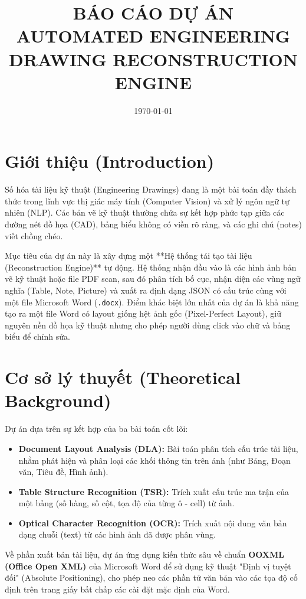\documentclass[12pt,a4paper]{article}
\title{\textbf{BÁO CÁO DỰ ÁN}\\ \Large{\textbf{AUTOMATED ENGINEERING DRAWING RECONSTRUCTION ENGINE}}}
\author{}
\date{\today}
\begin{document}
\maketitle
\tableofcontents
\newpage

\section{Giới thiệu (Introduction)}
Số hóa tài liệu kỹ thuật (Engineering Drawings) đang là một bài toán đầy thách thức trong lĩnh vực thị giác máy tính (Computer Vision) và xử lý ngôn ngữ tự nhiên (NLP). Các bản vẽ kỹ thuật thường chứa sự kết hợp phức tạp giữa các đường nét đồ họa (CAD), bảng biểu không có viền rõ ràng, và các ghi chú (notes) viết chồng chéo. 

Mục tiêu của dự án này là xây dựng một **Hệ thống tái tạo tài liệu (Reconstruction Engine)** tự động. Hệ thống nhận đầu vào là các hình ảnh bản vẽ kỹ thuật hoặc file PDF scan, sau đó phân tích bố cục, nhận diện các vùng ngữ nghĩa (Table, Note, Picture) và xuất ra định dạng JSON có cấu trúc cùng với một file Microsoft Word (\texttt{.docx}). Điểm khác biệt lớn nhất của dự án là khả năng tạo ra một file Word có layout giống hệt ảnh gốc (Pixel-Perfect Layout), giữ nguyên nền đồ họa kỹ thuật nhưng cho phép người dùng click vào chữ và bảng biểu để chỉnh sửa.

\section{Cơ sở lý thuyết (Theoretical Background)}
Dự án dựa trên sự kết hợp của ba bài toán cốt lõi:
\begin{itemize}
    \item \textbf{Document Layout Analysis (DLA):} Bài toán phân tích cấu trúc tài liệu, nhằm phát hiện và phân loại các khối thông tin trên ảnh (như Bảng, Đoạn văn, Tiêu đề, Hình ảnh).
    \item \textbf{Table Structure Recognition (TSR):} Trích xuất cấu trúc ma trận của một bảng (số hàng, số cột, tọa độ của từng ô - cell) từ ảnh.
    \item \textbf{Optical Character Recognition (OCR):} Trích xuất nội dung văn bản dạng chuỗi (text) từ các hình ảnh đã được phân vùng.
\end{itemize}

Về phần xuất bản tài liệu, dự án ứng dụng kiến thức sâu về chuẩn \textbf{OOXML (Office Open XML)} của Microsoft Word để sử dụng kỹ thuật "Định vị tuyệt đối" (Absolute Positioning), cho phép neo các phần tử văn bản vào các tọa độ cố định trên trang giấy bất chấp các cài đặt mặc định của Word.
\end{document}
